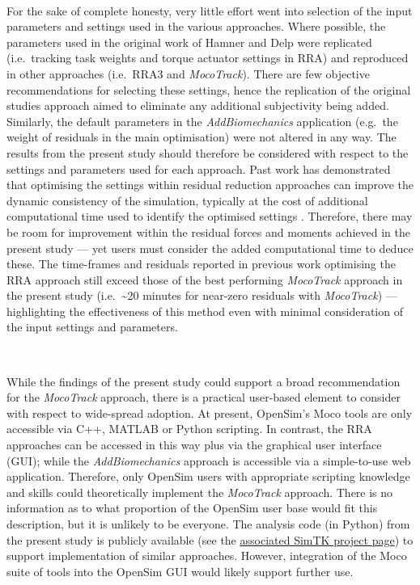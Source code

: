 \documentclass[]{elsarticle} %
\begin{document}
~

For the sake of complete honesty, very little effort went into selection
of the input parameters and settings used in the various approaches.
Where possible, the parameters used in the original work of Hamner and
Delp \citep{Hamner2013} were replicated (i.e.~tracking task weights and
torque actuator settings in RRA) and reproduced in other approaches
(i.e.~RRA3 and \emph{MocoTrack}). There are few objective
recommendations for selecting these settings, hence the replication of
the original studies \citep{Hamner2013} approach aimed to eliminate any
additional subjectivity being added. Similarly, the default parameters
in the \emph{AddBiomechanics} application (e.g.~the weight of residuals
in the main optimisation) were not altered in any way. The results from
the present study should therefore be considered with respect to the
settings and parameters used for each approach. Past work has
demonstrated that optimising the settings within residual reduction
approaches can improve the dynamic consistency of the simulation,
typically at the cost of additional computational time used to identify
the optimised settings \citep{Samaan2016, Sturdy2022}. Therefore, there
may be room for improvement within the residual forces and moments
achieved in the present study --- yet users must consider the added
computational time to deduce these. The time-frames and residuals
reported in previous work optimising the RRA approach
\citep{Samaan2016, Sturdy2022} still exceed those of the best performing
\emph{MocoTrack} approach in the present study (i.e.~\textasciitilde20
minutes for near-zero residuals with \emph{MocoTrack}) --- highlighting
the effectiveness of this method even with minimal consideration of the
input settings and parameters.

~

While the findings of the present study could support a broad
recommendation for the \emph{MocoTrack} approach, there is a practical
user-based element to consider with respect to wide-spread adoption. At
present, OpenSim's Moco tools are only accessible via C++, MATLAB or
Python scripting. In contrast, the RRA approaches can be accessed in
this way plus via the graphical user interface (GUI); while the
\emph{AddBiomechanics} approach is accessible via a simple-to-use web
application. Therefore, only OpenSim users with appropriate scripting
knowledge and skills could theoretically implement the \emph{MocoTrack}
approach. There is no information as to what proportion of the OpenSim
user base would fit this description, but it is unlikely to be everyone.
The analysis code (in Python) from the present study is publicly
available (see the
\href{https://simtk.org/projects/dynamic-quest}{associated SimTK project
page}) to support implementation of similar approaches. However,
integration of the Moco suite of tools into the OpenSim GUI would likely
support further use.
\end{document}
